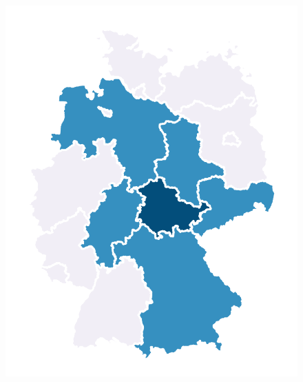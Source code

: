 \begin{figure}
\begin{minipage}[b]{.3\linewidth}
       \includegraphics[width=\linewidth,trim={1cm 1cm 1cm 1cm},clip]{body/figures/71-BL_nb_e.pdf}
    \end{minipage}
    \hfill
    \begin{minipage}[b]{.3\linewidth}

\end{minipage}
\end{figure}
